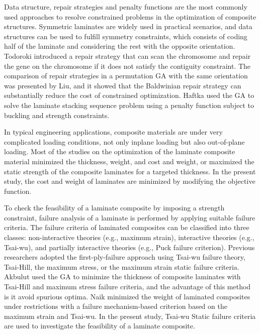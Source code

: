 \documentclass[USenglish]{article}
\begin{document}
Data structure, repair strategies and penalty functions\cite{le1995improved} are the most commonly used
approaches to resolve constrained problems in the optimization of composite structures. Symmetric
laminates are widely used in practical scenarios, and data structures can be used to fulfill symmetry
constraints, which consists of coding half of the laminate and considering the rest with the
opposite orientation. Todoroki\cite{todoroki1998stacking} introduced a repair strategy that can scan the chromosome and
repair the gene on the chromosome if it does not satisfy the contiguity constraint. The comparison of
repair strategies in a permutation GA with the same orientation was presented by Liu\cite{liu2000permutation}, and it
showed that the Baldwinian repair strategy can substantially reduce the cost of constrained optimization.
Haftka\cite{riche1993optimization} used the GA to solve the laminate stacking sequence problem using a penalty function subject to
buckling and strength constraints.

In typical engineering applications, composite materials are under very complicated loading
conditions, not only inplane loading but also out-of-plane loading. Most of the studies on the
optimization of the laminate composite material minimized the
thickness\cite{abu1998optimum,walker2003technique},
weight\cite{fang1993design,deka2005multiobjective,park2008improved}, and cost and
weight\cite{deka2005multiobjective,omkar2008artificial}, or maximized the static strength of
the composite laminates for a targeted
thickness\cite{walker2003technique,lin2004stacking,kim2007development}. %
In the present study,
the cost and weight of laminates are minimized by modifying the objective function.

To check the feasibility of a laminate composite by imposing a strength constraint, failure
analysis of a laminate is performed by applying suitable failure criteria. The failure criteria of
laminated composites can be classified into three classes: non-interactive theories (e.g., maximum
strain), interactive theories (e.g., Tsai-wu), and partially interactive theories (e.g., Puck failure
criterion). Previous researchers adopted the first-ply-failure approach using Tsai-wu
failure
theory\cite{massard1984computer,reddy1987first,fang1993design,soeiro1994multilevel,pelletier2006multi,jadhav2007parametric,omkar2008artificial,choudhury2019failure},
Tsai-Hill\cite{martin1987optimum,soares1995discrete}, the maximum stress\cite{watkins1987multicriteria}, or the maximum strain\cite{watkins1987multicriteria}
static failure criteria. Akbulut\cite{akbulut2008optimum} used the GA to minimize the thickness of composite laminates with
Tsai-Hill and maximum stress failure criteria, and the advantage of this method is it avoid spurious
optima. Naik\cite{naik2008design}
minimized the weight of laminated composites under restrictions with a
failure mechanism-based criterion based on the maximum strain and Tsai-wu. In the present study, Tsai-wu
Static failure criteria are used to investigate the feasibility of a laminate composite.
\end{document}
